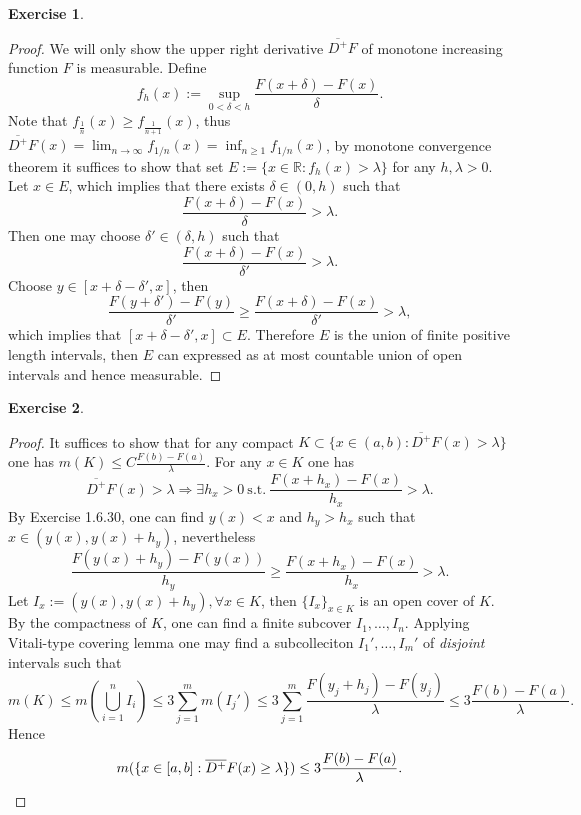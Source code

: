 \documentclass[a4paper]{article}
\newtheorem{ex}{Exercise}[subsection]
\begin{document}
\begin{ex}\end{ex}\begin{proof}
We will only show the upper right derivative $\overline{D^+}F$ of monotone increasing function $F$ is measurable. Define $$
f_h(x) := \sup_{0 < \delta < h}\frac{F(x + \delta) - F(x)}{\delta}.
$$Note that $f_{\frac{1}{n}}(x) \geq f_{\frac{1}{n + 1}}(x)$, thus 
$\overline{D^+}F(x) = \lim_{n \to \infty}f_{1/n}(x) = \inf_{n \geq 1}f_{1/n}(x)$, by monotone convergence theorem 
it suffices to show that set $E := \{x \in \mathbb{R} : f_h(x) > \lambda\}$ for any $h, \lambda > 0$. Let $x \in E$, 
which implies that there exists $\delta \in (0, h)$ such that $$
\frac{F(x + \delta) - F(x)}{\delta} > \lambda.
$$Then one may choose $\delta' \in (\delta, h)$ such that $$
\frac{F(x + \delta) - F(x)}{\delta'} > \lambda.
$$Choose $y \in [x + \delta - \delta', x]$, then $$
\frac{F(y + \delta') - F(y)}{\delta'} \geq \frac{F(x + \delta) - F(x)}{\delta'} > \lambda,
$$which implies that $[x + \delta - \delta', x] \subset E$. Therefore $E$ is the union of finite positive length 
intervals, then $E$ can expressed as at most countable union of open intervals and hence measurable.
\end{proof}

\begin{ex}\end{ex}\begin{proof}
It suffices to show that for any compact $K \subset \{x \in (a, b) : \overline{D^+}F(x) > \lambda\}$ one has 
$m(K) \leq C\frac{F(b) - F(a)}{\lambda}$. For any $x \in K$ one has $$
\overline{D^+}F(x) > \lambda \Rightarrow \exists h_x > 0\ \mathrm{s.t.}\ \frac{F(x + h_x) - F(x)}{h_x} > \lambda.
$$By Exercise 1.6.30, one can find $y(x) < x$ and $h_y > h_x$ such that $x \in (y(x), y(x) + h_y)$, nevertheless$$
\frac{F(y(x) + h_y) - F(y(x))}{h_y} \geq \frac{F(x + h_x) - F(x)}{h_x} > \lambda.
$$Let $I_x := (y(x), y(x) + h_y), \forall x \in K$, then $\{I_x\}_{x \in K}$ is an open cover of $K$. By the 
compactness of $K$, one can find a finite subcover $I_1, \dots, I_n$. Applying Vitali-type covering lemma one may
find a subcolleciton $I_1', \dots, I_m'$ of \emph{disjoint} intervals such that $$
m(K) \leq m(\bigcup_{i = 1}^n I_i) \leq 3\sum_{j = 1}^m m(I_j') \leq 3\sum_{j = 1}^m \frac{F(y_j + h_j) - F(y_j)}{\lambda}
\leq 3\frac{F(b) - F(a)}{\lambda}.
$$Hence \[
m(\{x \in [a, b] : \overline{D^+}F(x) \geq \lambda\}) \leq 3\frac{F(b) - F(a)}{\lambda}.\qedhere
\]
\end{proof}
\end{document}
